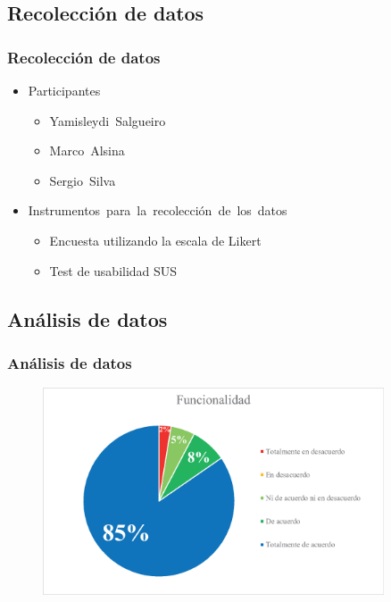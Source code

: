 \documentclass[9pt]{beamer}
\begin{document}
    \subsection{Recolección de datos}
    \begin{frame}
        \frametitle{Recolección de datos}                       
        
        
        \begin{itemize}
            \item Participantes
            \begin{itemize}
                \item Yamisleydi Salgueiro
                \item Marco Alsina
                \item Sergio Silva
            \end{itemize}

            \item Instrumentos para la recolección de los datos
            \begin{itemize}
                \item Encuesta utilizando la escala de Likert
                \item Test de usabilidad SUS
            \end{itemize}
        \end{itemize}

    \end{frame}

    \subsection{Análisis de datos}
    \begin{frame}      
        \frametitle{Análisis de datos}
        \begin{figure}
            \centering
            \includegraphics[width=0.9\textwidth]{assets/Evaluacion/funcionality.eps}
        \end{figure}
    \end{frame}
\end{document}
